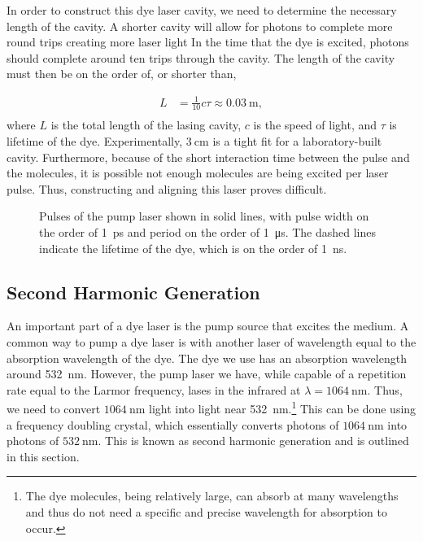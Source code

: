 In order to construct this dye laser cavity, we need to determine the necessary length of the cavity. A shorter cavity will allow for photons to complete more round trips creating more laser light In the time that the dye is excited, photons should complete around ten trips through the cavity. The length of the cavity must then be on the order of, or shorter than,

\begin{equation}
  \begin{split}
  L & = \frac{1}{10} c \tau  \approx \SI{0.03}{\meter},\\
\end{split}
  \label{cavitylength}
\end{equation}
%
where $L$ is the total length of the lasing cavity, $c$ is the speed of light, and $\tau$ is lifetime of the dye. Experimentally, $\SI{3}{\centi\meter}$ is a tight fit for a laboratory-built cavity. Furthermore, because of the short interaction time between the pulse and the molecules, it is possible not enough molecules are being excited per laser pulse. Thus, constructing and aligning this laser proves difficult.

\begin{figure}[htpb]
	\centering
	
	\caption{Pulses of the pump laser shown in solid lines, with pulse width on the order of \SI{1}{\pico \second} and period on the order of \SI{1}{\micro \second}. The dashed lines indicate the lifetime of the dye, which is on the order of \SI{1}{\nano \second}.}
	\label{fig:tikzpulses}
\end{figure}




\subsection{Second Harmonic Generation}

An important part of a dye laser is the pump source that excites the medium. A common way to pump a dye laser is with another laser of wavelength equal to the absorption wavelength of the dye. The dye we use has an absorption wavelength around \SI{532}{\nano \meter}. However, the pump laser we have, while capable of a repetition rate equal to the Larmor frequency, lases in the infrared at $\lambda = \SI{1064}{\nano \meter}$. Thus, we need to convert $\SI{1064}{\nano \meter}$ light into light near \SI{532}{\nano \meter}.\footnote{The dye molecules, being relatively large, can absorb at many wavelengths and thus do not need a specific and precise wavelength for absorption to occur.} This can be done using a frequency doubling crystal, which essentially converts photons of $\SI{1064}{\nano \meter}$ into photons of $\SI{532}{\nano \meter}$. This is known as second harmonic generation and is outlined in this section.

